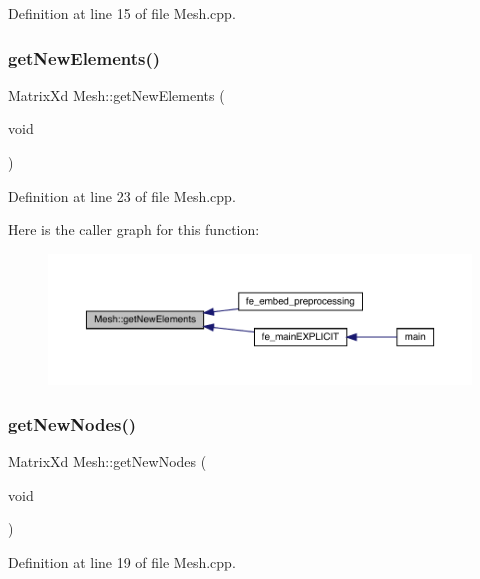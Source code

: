 Definition at line 15 of file Mesh.\+cpp.

\mbox{\label{class_mesh_af242dbb4627c09410975a0e67389e0de}} 
\subsubsection{\texorpdfstring{get\+New\+Elements()}{getNewElements()}}
{\footnotesize\ttfamily Matrix\+Xd Mesh\+::get\+New\+Elements (\begin{DoxyParamCaption}\item[{void}]{ }\end{DoxyParamCaption})}



Definition at line 23 of file Mesh.\+cpp.

Here is the caller graph for this function\+:
\nopagebreak
\begin{figure}[H]
\begin{center}
\leavevmode
\includegraphics[width=350pt]{class_mesh_af242dbb4627c09410975a0e67389e0de_icgraph}
\end{center}
\end{figure}
\mbox{\label{class_mesh_a52ecce406bbef80cbf3610db3ea5ea40}} 
\subsubsection{\texorpdfstring{get\+New\+Nodes()}{getNewNodes()}}
{\footnotesize\ttfamily Matrix\+Xd Mesh\+::get\+New\+Nodes (\begin{DoxyParamCaption}\item[{void}]{ }\end{DoxyParamCaption})}



Definition at line 19 of file Mesh.\+cpp.


